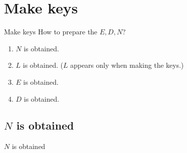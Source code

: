 \documentclass[dvipdfmx]{beamer}
\begin{document}
\section*{Make keys}
\begin{frame}{Make keys}
    How to prepare the \(E,D,N\)?
    \begin{enumerate}
        \item \(N\) is obtained.
        \item \(L\) is obtained. (\(L\) appears only when making the keys.)
        \item \(E\) is obtained.
        \item \(D\) is obtained.
    \end{enumerate}
\end{frame}
\subsection*{\(N\) is obtained}
\begin{frame}{\(N\) is obtained}
    
\end{frame}
\end{document}
